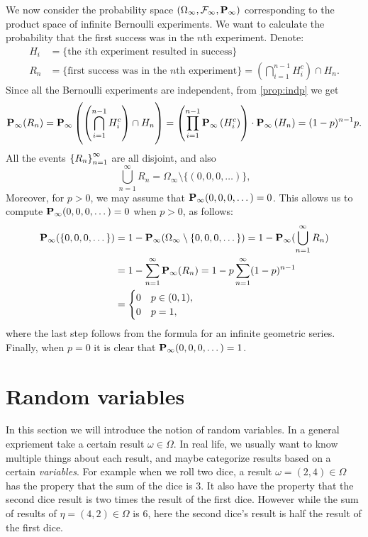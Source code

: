 \documentclass[11pt,a4paper]{article}
\begin{document}
\begin{example}
  We now consider the probability space 
  $(\Omega_{\infty}, \mathcal F_{\infty}, \mathbf{P}_{\infty})$
  corresponding to the product space of infinite Bernoulli experiments.
  We want to calculate the probability that the first success was in 
  the $n$th experiment. Denote:
  \begin{align*}
    H_i &= \{\text{the $i$th experiment resulted in success}\} \\
    R_n &= \{\text{first success was in the $n$th experiment}\} = 
    \left(\bigcap_{i=1}^{n-1} H_i^c\right) \cap H_n.
  \end{align*}
  Since all the Bernoulli experiments are independent, from 
  \autoref{prop:indp} we get
  \[
    \mathbf{P}_{\infty}(R_{n}) = 
    \mathbf{P}_{\infty} \left(\left(\bigcap_{i=1}^{n-1} H_i^c\right) \cap H_n\right) = 
    \left(\prod_{i=1}^{n-1} \mathbf{P}_{\infty} \left(H_{i}^{c}\right)\right) \cdot \mathbf{P}_{\infty} \left(H_{n}\right) =
    (1-p)^{n-1}p.
  \]
  All the events $\left\{R_n\right\}_{n=1}^{\infty}$ are all
  disjoint, and also
  \[
    \bigcup_{n=1}^{\infty} R_n = \Omega_\infty \setminus \{(0,0,0,\dots)\},
  \]
  Moreover, for $p > 0$, we may assume that $\mathbf{P}_\infty(0,0,0,\dots) = 0$.
  This allows us to compute $\mathbf{P}_\infty(0,0,0,\dots) = 0$ when $p > 0$,
  as follows:
  \begin{align*}
    \mathbf{P}_{\infty}(\{0,0,0,\dots\}) &= 
    1 - \mathbf{P}_\infty(\Omega_\infty \setminus \{0,0,0,\dots\}) =
    1 - \mathbf{P}_\infty(\bigcup_{n=1}^{\infty} R_n) \\ &=
    1 - \sum_{n=1}^{\infty} \mathbf{P}_\infty(R_n) =
    1 - p \sum_{n=1}^{\infty} (1-p)^{n-1} \\ &=
    \begin{cases}
      0 &p \in (0,1), \\
      0 &p = 1,
    \end{cases}
  \end{align*}
  where the last step follows from the formula for an infinite geometric
  series.
  Finally, when $p = 0$ it is clear that $\mathbf{P}_\infty(0,0,0,\dots) = 1$.
\end{example}

\newpage

\section{Random variables}
\label{sec:random-variables}
In this section we will introduce the notion of random variables.
In a general expriement take a certain result $\omega \in \Omega$.
In real life, we usually want to know multiple things about each result,
and maybe categorize results based on a certain \textit{variables}.
For example when we roll two dice, a result $\omega = (2,4) \in \Omega$
has the propery that the sum of the dice is $3$.
It also have the property that the second dice result is two times
the result of the first dice.
However while the sum of results of $\eta = (4,2) \in \Omega$ is $6$,
here the second dice's result is half the result of the first dice.
\end{document}
